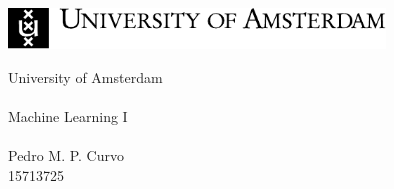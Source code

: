 \thispagestyle {empty}
\begin{center}
\begin{minipage}[c][5cm][t]{\textwidth}
\begin{center}
\includegraphics[width=10cm]{./logo/logoUvA_en.pdf}
\end{center}

\end{minipage}
\begin{minipage}[t][10cm][c]{\textwidth}
\centering
{\FontMb University of Amsterdam} \\
\paragraph{}
\centering
{\FontLb\Huge \title{}}
\paragraph{}
\centering
{\FontMb Machine Learning I} \\
\paragraph{}
{}
\end{minipage}

\begin{minipage}[c][2cm][c]{\textwidth}
\centering
{\FontLn }
\end{minipage}
\begin{minipage}[c][2cm][c]{\textwidth}
\centering
\end{minipage}
\begin{minipage}[c][8cm][c]{\textwidth}
\centering
{\FontMb
Pedro M. P. Curvo\\
15713725}
\end{minipage}

\end{center}